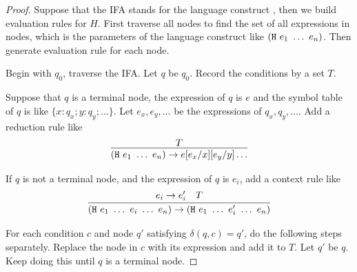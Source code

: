 \begin{proof}

    Suppose that the IFA stands for the language construct , then we build evaluation rules for $H$. First traverse all nodes to find the set of all expressions in nodes, which is the parameters of the language construct  like $(\mbox{\tt H}~e_1~\ldots~e_n)$. Then generate evaluation rule for each node.

    Begin with $q_0$, traverse the IFA. Let $q$ be $q_0$. Record the conditions by a set $T$.

    Suppose that $q$ is a terminal node, the expression of $q$ is $e$ and the symbol table of $q$ is like $\{x:q_x; y:q_y; \ldots\}$. Let $e_x,e_y,\ldots$ be the expressions of $q_x, q_y, \ldots$. Add a reduction rule like
    \[
        \infer{(\m{H}~e_1~\ldots~e_n) \to e[e_x/x][e_y/y]\ldots}{T}
    \]

    If $q$ is not a terminal node, and the expression of $q$ is $e_i$, add a context rule like
    \[
        \infer{(\m{H}~e_1~\ldots~e_i~\ldots~e_n) \to (\m{H}~e_1~\ldots~e_i'~\ldots~e_n)}{e_i \to e_i' \quad T}
    \]


    For each condition $c$ and node $q'$ satisfying $\delta(q, c)=q'$, do the following steps separately. Replace the node in $c$ with its expression and add it to $T$. Let $q'$ be $q$. Keep doing this until $q$ is a terminal node.
\end{proof}

